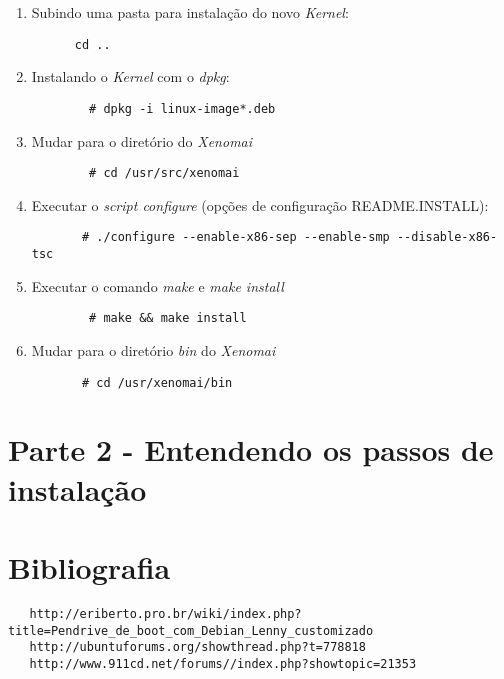 \documentclass[a4paper,10pt]{article}
\begin{document}
\begin{enumerate}
	\item Subindo uma pasta para instalação do novo \emph{Kernel}:
	  \begin{lstlisting}
	  cd ..
	  \end{lstlisting}

	\item Instalando o \emph{Kernel} com o \emph{dpkg}:
	  \begin{lstlisting}
	    # dpkg -i linux-image*.deb
	  \end{lstlisting}

	\item Mudar para o diretório do \emph{Xenomai}
	  \begin{lstlisting}
	    # cd /usr/src/xenomai
	  \end{lstlisting}

	\item Executar o \emph{script configure} (opções de configuração README.INSTALL):
	  \begin{lstlisting}
	   # ./configure --enable-x86-sep --enable-smp --disable-x86-tsc
	  \end{lstlisting}

	\item Executar o comando \emph{make} e \emph{make install}
	  \begin{lstlisting}
	    # make && make install
	  \end{lstlisting}

	\item Mudar para o diretório \emph{bin} do \emph{Xenomai}
	  \begin{lstlisting}
	   # cd /usr/xenomai/bin
	  \end{lstlisting}    

      \end{enumerate}

\newpage
\section{Parte 2 - Entendendo os passos de instalação}

\newpage
\section{Bibliografia}

  \begin{lstlisting}
   http://eriberto.pro.br/wiki/index.php?title=Pendrive_de_boot_com_Debian_Lenny_customizado
   http://ubuntuforums.org/showthread.php?t=778818 
   http://www.911cd.net/forums//index.php?showtopic=21353
  \end{lstlisting}
\end{document}
